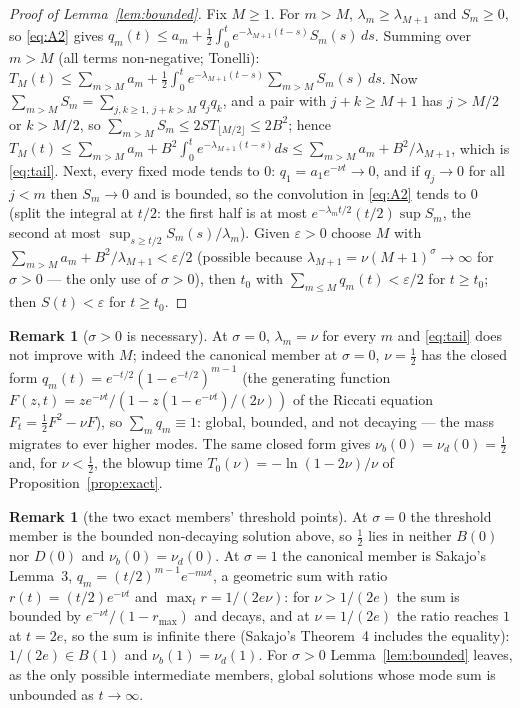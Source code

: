 \documentclass[11pt,a4paper]{article}
\theoremstyle{plain}
\theoremstyle{definition}
\newtheorem{remark}[theorem]{Remark}
\begin{document}
\begin{proof}[Proof of Lemma~\ref{lem:bounded}]
Fix $M\ge1$. For $m>M$, $\lambda_m\ge\lambda_{M+1}$ and $S_m\ge0$, so \eqref{eq:A2} gives $q_m(t)\le a_m+\tfrac12\int_0^te^{-\lambda_{M+1}(t-s)}S_m(s)\,ds$. Summing over $m>M$ (all terms non-negative; Tonelli): $T_M(t)\le\sum_{m>M}a_m+\tfrac12\int_0^te^{-\lambda_{M+1}(t-s)}\sum_{m>M}S_m(s)\,ds$. Now $\sum_{m>M}S_m=\sum_{j,k\ge1,\ j+k>M}q_jq_k$, and a pair with $j+k\ge M+1$ has $j>M/2$ or $k>M/2$, so $\sum_{m>M}S_m\le2ST_{\lfloor M/2\rfloor}\le2B^2$; hence $T_M(t)\le\sum_{m>M}a_m+B^2\int_0^te^{-\lambda_{M+1}(t-s)}ds\le\sum_{m>M}a_m+B^2/\lambda_{M+1}$, which is \eqref{eq:tail}. Next, every fixed mode tends to $0$: $q_1=a_1e^{-\nu t}\to0$, and if $q_j\to0$ for all $j<m$ then $S_m\to0$ and is bounded, so the convolution in \eqref{eq:A2} tends to $0$ (split the integral at $t/2$: the first half is at most $e^{-\lambda_mt/2}(t/2)\sup S_m$, the second at most $\sup_{s\ge t/2}S_m(s)/\lambda_m$). Given $\varepsilon>0$ choose $M$ with $\sum_{m>M}a_m+B^2/\lambda_{M+1}<\varepsilon/2$ (possible because $\lambda_{M+1}=\nu(M+1)^\sigma\to\infty$ for $\sigma>0$ --- the only use of $\sigma>0$), then $t_0$ with $\sum_{m\le M}q_m(t)<\varepsilon/2$ for $t\ge t_0$; then $S(t)<\varepsilon$ for $t\ge t_0$.
\end{proof}

\begin{remark}[$\sigma>0$ is necessary]\label{rem:sigma0}
At $\sigma=0$, $\lambda_m=\nu$ for every $m$ and \eqref{eq:tail} does not improve with $M$; indeed the canonical member at $\sigma=0$, $\nu=\tfrac12$ has the closed form $q_m(t)=e^{-t/2}(1-e^{-t/2})^{m-1}$ (the generating function $F(z,t)=ze^{-\nu t}/(1-z(1-e^{-\nu t})/(2\nu))$ of the Riccati equation $F_t=\tfrac12F^2-\nu F$), so $\sum_mq_m\equiv1$: global, bounded, and not decaying --- the mass migrates to ever higher modes. The same closed form gives $\nu_b(0)=\nu_d(0)=\tfrac12$ and, for $\nu<\tfrac12$, the blowup time $T_0(\nu)=-\ln(1-2\nu)/\nu$ of Proposition~\ref{prop:exact}.
\end{remark}

\begin{remark}[the two exact members' threshold points]\label{rem:exact}
At $\sigma=0$ the threshold member is the bounded non-decaying solution above, so $\tfrac12$ lies in neither $B(0)$ nor $D(0)$ and $\nu_b(0)=\nu_d(0)$. At $\sigma=1$ the canonical member is Sakajo's Lemma~3, $q_m=(t/2)^{m-1}e^{-m\nu t}$, a geometric sum with ratio $r(t)=(t/2)e^{-\nu t}$ and $\max_tr=1/(2e\nu)$: for $\nu>1/(2e)$ the sum is bounded by $e^{-\nu t}/(1-r_{\max})$ and decays, and at $\nu=1/(2e)$ the ratio reaches $1$ at $t=2e$, so the sum is infinite there (Sakajo's Theorem~4 includes the equality): $1/(2e)\in B(1)$ and $\nu_b(1)=\nu_d(1)$. For $\sigma>0$ Lemma~\ref{lem:bounded} leaves, as the only possible intermediate members, global solutions whose mode sum is unbounded as $t\to\infty$.
\end{remark}
\end{document}
